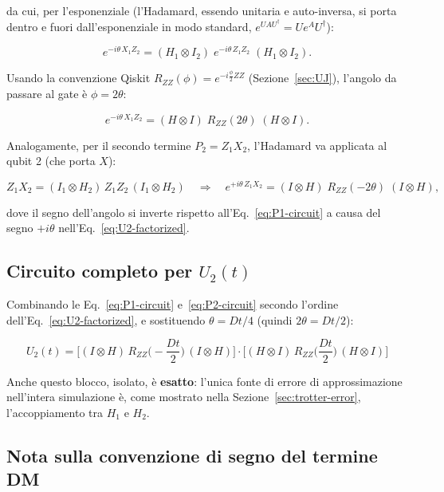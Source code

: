 \documentclass[11pt,a4paper]{article}
\begin{document}
da cui, per l'esponenziale (l'Hadamard, essendo unitaria e auto-inversa, si porta dentro e fuori dall'esponenziale in modo standard, $e^{U A U^\dagger}=U e^A U^\dagger$):

\begin{equation}
e^{-i\theta\,X_1Z_2} = (H_1\otimes I_2)\;e^{-i\theta\,Z_1Z_2}\;(H_1\otimes I_2).
\end{equation}

Usando la convenzione Qiskit $R_{ZZ}(\phi)=e^{-i\frac{\phi}{2}ZZ}$ (Sezione~\ref{sec:UJ}), l'angolo da passare al gate è $\phi=2\theta$:

\begin{equation}
e^{-i\theta\,X_1Z_2} = (H\otimes I)\;R_{ZZ}(2\theta)\;(H\otimes I).
\label{eq:P1-circuit}
\end{equation}

Analogamente, per il secondo termine $P_2=Z_1X_2$, l'Hadamard va applicata al qubit 2 (che porta $X$):

\begin{equation}
Z_1X_2 = (I_1\otimes H_2)\,Z_1Z_2\,(I_1\otimes H_2) \quad\Longrightarrow\quad e^{+i\theta\,Z_1X_2} = (I\otimes H)\;R_{ZZ}(-2\theta)\;(I\otimes H),
\label{eq:P2-circuit}
\end{equation}

dove il segno dell'angolo si inverte rispetto all'Eq.~\eqref{eq:P1-circuit} a causa del segno $+i\theta$ nell'Eq.~\eqref{eq:U2-factorized}.

\subsection{Circuito completo per $U_2(t)$}

Combinando le Eq.~\eqref{eq:P1-circuit} e~\eqref{eq:P2-circuit} secondo l'ordine dell'Eq.~\eqref{eq:U2-factorized}, e sostituendo $\theta=Dt/4$ (quindi $2\theta=Dt/2$):

\begin{equation}
\boxed{U_2(t) = \Big[(I\otimes H)\,R_{ZZ}\!\Big(-\dfrac{Dt}{2}\Big)\,(I\otimes H)\Big]\cdot\Big[(H\otimes I)\,R_{ZZ}\!\Big(\dfrac{Dt}{2}\Big)\,(H\otimes I)\Big]}
\end{equation}

Anche questo blocco, isolato, è \textbf{esatto}: l'unica fonte di errore di approssimazione nell'intera simulazione è, come mostrato nella Sezione~\ref{sec:trotter-error}, l'accoppiamento tra $H_1$ e $H_2$.

\subsection{Nota sulla convenzione di segno del termine DM}
\end{document}
